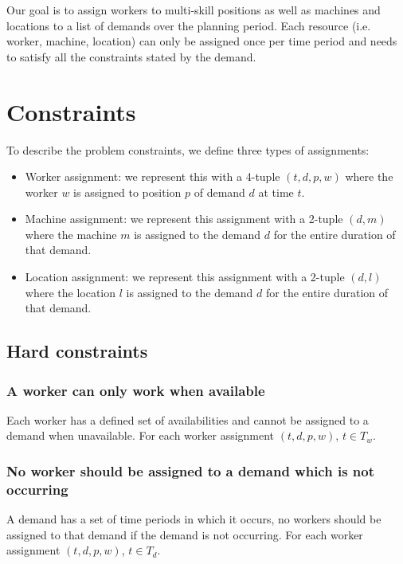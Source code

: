 \documentclass[../thesis.tex]{subfiles}
\begin{document}
Our goal is to assign workers to multi-skill positions as well as machines and locations to a list of demands over the planning period.
Each resource (i.e. worker, machine, location) can only be assigned once per time period and needs to satisfy all the constraints stated by the demand. 

\section{Constraints}

To describe the problem constraints, we define three types of assignments:

\begin{itemize}
  \item Worker assignment: we represent this with a 4-tuple $(t, d, p, w)$ where the worker $w$ is assigned to position $p$ of demand $d$ at time $t$.
  \item Machine assignment: we represent this assignment with a 2-tuple $(d, m)$ where the machine $m$ is assigned to the 
        demand $d$ for the entire duration of that demand.
  \item Location assignment: we represent this assignment 
        with a 2-tuple $(d, l)$ where the location $l$ is assigned to the demand $d$ for the entire duration 
        of that demand.
\end{itemize}

\subsection{Hard constraints}

\subsubsection{A worker can only work when available}

Each worker has a defined set of availabilities and cannot be assigned to a demand when 
unavailable.
For each worker assignment $(t, d, p, w)$, $t \in T_w$.

\subsubsection{No worker should be assigned to a demand which is not occurring}

A demand has a set of time periods in which it occurs,
no workers should be assigned to that demand if the demand is not 
occurring. 
For each worker assignment $(t, d, p, w)$, $t \in T_d$.
\end{document}
